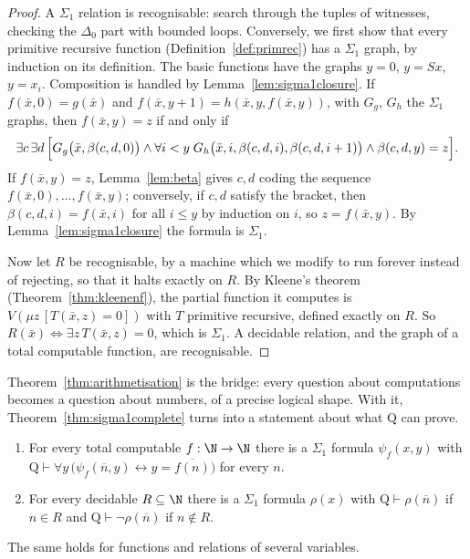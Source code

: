 \begin{proof}
A $\Sigma_1$ relation is recognisable: search through the tuples of witnesses, checking the $\Delta_0$ part with bounded loops. Conversely, we first show that every primitive recursive function (Definition~\ref{def:primrec}) has a $\Sigma_1$ graph, by induction on its definition. The basic functions have the graphs $y=0$, $y=Sx$, $y=x_i$. Composition is handled by Lemma~\ref{lem:sigma1closure}. If $f(\bar x,0)=g(\bar x)$ and $f(\bar x,y+1)=h(\bar x,y,f(\bar x,y))$, with $G_g$, $G_h$ the $\Sigma_1$ graphs, then $f(\bar x,y)=z$ if and only if
\[
\exists c\,\exists d\,\Bigl[G_g\bigl(\bar x,\beta(c,d,0)\bigr)\land\forall i<y\;G_h\bigl(\bar x,i,\beta(c,d,i),\beta(c,d,i+1)\bigr)\land\beta(c,d,y)=z\Bigr].
\]
If $f(\bar x,y)=z$, Lemma~\ref{lem:beta} gives $c,d$ coding the sequence $f(\bar x,0),\dots,f(\bar x,y)$; conversely, if $c,d$ satisfy the bracket, then $\beta(c,d,i)=f(\bar x,i)$ for all $i\le y$ by induction on $i$, so $z=f(\bar x,y)$. By Lemma~\ref{lem:sigma1closure} the formula is $\Sigma_1$.

Now let $R$ be recognisable, by a machine which we modify to run forever instead of rejecting, so that it halts exactly on $R$. By Kleene's theorem (Theorem~\ref{thm:kleenenf}), the partial function it computes is $V(\mu z\,[T(\bar x,z)=0])$ with $T$ primitive recursive, defined exactly on $R$. So $R(\bar x)\iff\exists z\,T(\bar x,z)=0$, which is $\Sigma_1$. A decidable relation, and the graph of a total computable function, are recognisable.
\end{proof}

Theorem~\ref{thm:arithmetisation} is the bridge: every question about computations becomes a question about numbers, of a precise logical shape. With it, Theorem~\ref{thm:sigma1complete} turns into a statement about what $\mathrm Q$ can prove.

\begin{theorem}[representability]\label{thm:representability}
\begin{enumerate}
\item For every total computable $f:\N\to\N$ there is a $\Sigma_1$ formula $\psi_f(x,y)$ with $\mathrm Q\vdash\forall y\,\bigl(\psi_f(\overline n,y)\leftrightarrow y=\overline{f(n)}\bigr)$ for every $n$.
\item For every decidable $R\subseteq\N$ there is a $\Sigma_1$ formula $\rho(x)$ with $\mathrm Q\vdash\rho(\overline n)$ if $n\in R$ and $\mathrm Q\vdash\neg\rho(\overline n)$ if $n\notin R$.
\end{enumerate}
The same holds for functions and relations of several variables.
\end{theorem}

